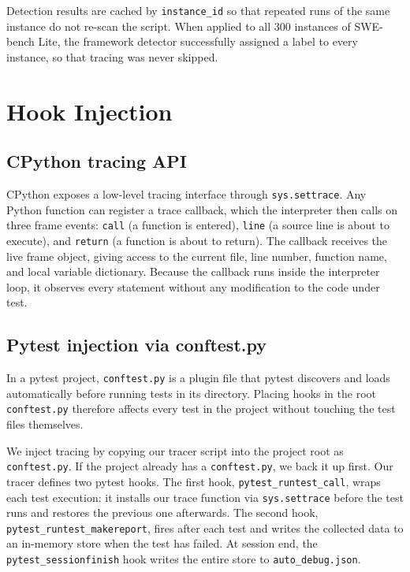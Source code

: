 Detection results are cached by \texttt{instance\_id} so that repeated runs of the same instance do not re-scan the script. When applied to all 300 instances of SWE-bench Lite, the framework detector successfully assigned a label to every instance, so that tracing was never skipped.

\section{Hook Injection}
\label{sec:hook-injection}

\subsection{CPython tracing API}

CPython exposes a low-level tracing interface through \texttt{sys.settrace}. Any Python function can register a trace callback, which the interpreter then calls on three frame events: \texttt{call} (a function is entered), \texttt{line} (a source line is about to execute), and \texttt{return} (a function is about to return). The callback receives the live frame object, giving access to the current file, line number, function name, and local variable dictionary. Because the callback runs inside the interpreter loop, it observes every statement without any modification to the code under test.

\subsection{Pytest injection via conftest.py}

In a pytest project, \texttt{conftest.py} is a plugin file that pytest discovers and loads automatically before running tests in its directory. Placing hooks in the root \texttt{conftest.py} therefore affects every test in the project without touching the test files themselves.

We inject tracing by copying our tracer script into the project root as \texttt{conftest.py}. If the project already has a \texttt{conftest.py}, we back it up first. Our tracer defines two pytest hooks. The first hook, \texttt{pytest\_runtest\_call}, wraps each test execution: it installs our trace function via \texttt{sys.settrace} before the test runs and restores the previous one afterwards. The second hook, \texttt{pytest\_runtest\_makereport}, fires after each test and writes the collected data to an in-memory store when the test has failed. At session end, the \texttt{pytest\_sessionfinish} hook writes the entire store to \texttt{auto\_debug.json}.

